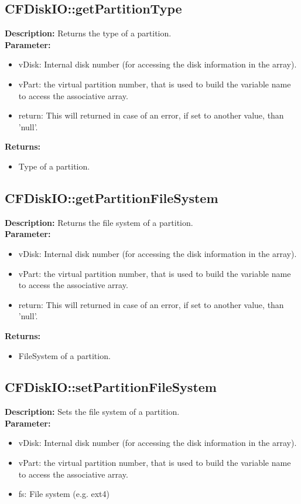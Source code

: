 \subsection{CFDiskIO::getPartitionType}
\textbf{Description:} Returns the type of a partition.\\
\textbf{Parameter:}
\begin{itemize}
\item vDisk: Internal disk number (for accessing the disk information in the array).
\item vPart: the virtual partition number, that is used to build the variable name to access the associative array.
\item return: This will returned in case of an error, if set to another value, than 'null'.
\end{itemize}
\textbf{Returns:}
\begin{itemize}
\item Type of a partition.
\end{itemize}

\subsection{CFDiskIO::getPartitionFileSystem}
\textbf{Description:} Returns the file system of a partition.\\
\textbf{Parameter:}
\begin{itemize}
\item vDisk: Internal disk number (for accessing the disk information in the array).
\item vPart: the virtual partition number, that is used to build the variable name to access the associative array.
\item return: This will returned in case of an error, if set to another value, than 'null'.
\end{itemize}
\textbf{Returns:}
\begin{itemize}
\item FileSystem of a partition.
\end{itemize}

\subsection{CFDiskIO::setPartitionFileSystem}
\textbf{Description:} Sets the file system of a partition.\\
\textbf{Parameter:}
\begin{itemize}
\item vDisk: Internal disk number (for accessing the disk information in the array).
\item vPart: the virtual partition number, that is used to build the variable name to access the associative array.
\item fs: File system (e.g. ext4)
\end{itemize}

